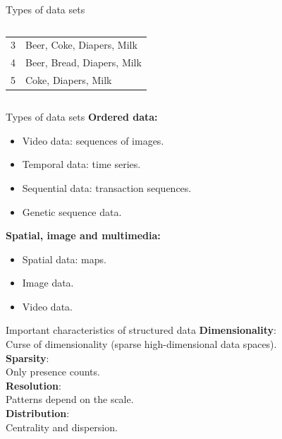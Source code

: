 \documentclass[aspectratio=169,t]{beamer}
\begin{document}
{\begin{frame}{Types of data sets}
\begin{columns}
\begin{column}{0.45\textwidth}
\begin{table}
\begin{tabular} { | c | l |}
          3 & Beer, Coke, Diapers, Milk\\
          4 & Beer, Bread, Diapers, Milk\\
          5 & Coke, Diapers, Milk \\
          \hline
          \end{tabular}
        \end{table}
        \end{column}
      \end{columns}
    \end{frame}
  }

  { 
    \begin{frame}{Types of data sets}
          \textbf{Ordered data:}
          \begin{itemize}[noitemsep]
              \item Video data: sequences of images.
              \item Temporal data: time series.
              \item Sequential data: transaction sequences.
              \item Genetic sequence data.
          \end{itemize}
          \textbf{Spatial, image and multimedia:}
          \begin{itemize}[noitemsep]
              \item Spatial data: maps.
              \item Image data.
              \item Video data.
          \end{itemize}
    \end{frame}
  }

  { 
    \begin{frame}{Important characteristics of structured data}
        \textbf{Dimensionality}:\\
        Curse of dimensionality (sparse high-dimensional data spaces).\\[0.2cm]

        \textbf{Sparsity}:\\
        Only presence counts.\\[0.2cm]

        \textbf{Resolution}:\\
        Patterns depend on the scale.\\[0.2cm]

        \textbf{Distribution}:\\
        Centrality and dispersion.
    \end{frame}
  }
\end{document}
